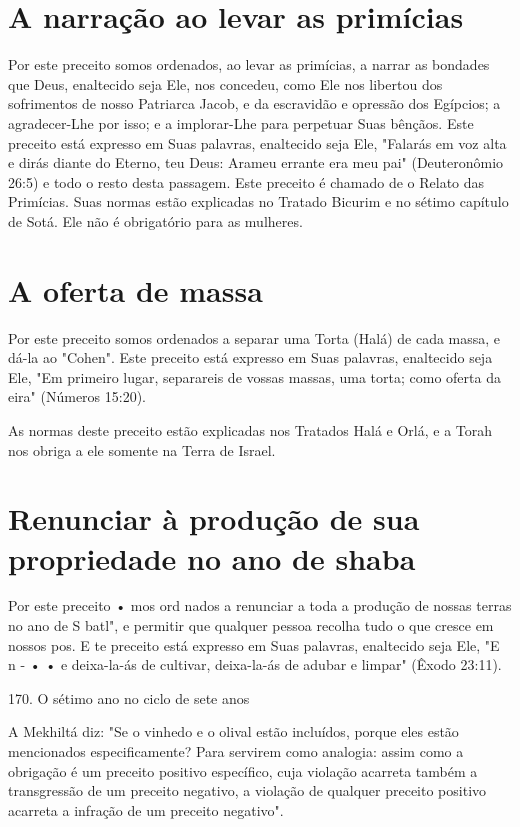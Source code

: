 \begin{itemize}
\begin{enumrate}
\begin{itemize}
\begin{itemize}
\begin{itemize}
\section{A narração ao levar as primícias}

Por este preceito somos ordenados, ao levar as primícias, a narrar as
bondades que Deus, enaltecido seja Ele, nos concedeu, como Ele nos
liber­tou dos sofrimentos de nosso Patriarca Jacob, e da escravidão e
opressão dos Egípcios; a agradecer-Lhe por isso; e a implorar-Lhe para
perpetuar Suas bên­çãos. Este preceito está expresso em Suas palavras,
enaltecido seja Ele, "Falarás em voz alta e dirás diante do Eterno, teu
Deus: Arameu errante era meu pai" (Deuteronômio 26:5) e todo o resto
desta passagem. Este preceito é chamado de o Relato das Primícias. Suas
normas estão explicadas no Tratado Bicurim e no sétimo capítulo de Sotá.
Ele não é obrigatório para as mulheres.

\section{A oferta de massa}

Por este preceito somos ordenados a separar uma Torta (Halá) de ca­da
massa, e dá-la ao "Cohen". Este preceito está expresso em Suas palavras,
enaltecido seja Ele, "Em primeiro lugar, separareis de vossas massas,
uma torta; como oferta da eira" (Números 15:20).

As normas deste preceito estão explicadas nos Tratados Halá e Orlá, e a
Torah nos obriga a ele somente na Terra de Israel.

\section{Renunciar à produção de sua propriedade no ano de shaba}

Por este preceito • mos ord nados a renunciar a toda a produção de
nossas terras no ano de S batl", e permitir que qualquer pessoa recolha
tudo o que cresce em nossos pos. E te preceito está expresso em Suas
pala­vras, enaltecido seja Ele, "E n - • • e deixa-la-ás de cultivar,
deixa-la-ás de adu­bar e limpar" (Êxodo 23:11).

170. O sétimo ano no ciclo de sete anos

A Mekhiltá diz: "Se o vinhedo e o olival estão incluídos, porque eles
estão mencionados especificamente? Para servirem como analogia: assim
co­mo a obrigação é um preceito positivo específico, cuja violação
acarreta tam­bém a transgressão de um preceito negativo, a violação de
qualquer preceito positivo acarreta a infração de um preceito negativo".


\end{itemize}
\end{itemize}
\end{itemize}
\end{enumrate}
\end{itemize}
